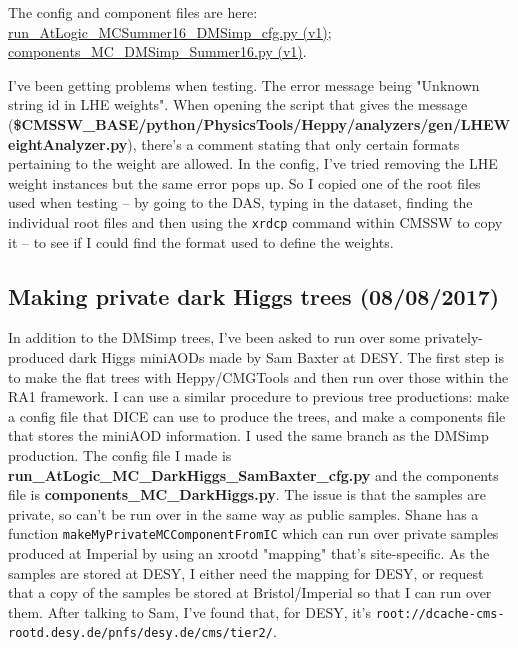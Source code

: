 The config and component files are here: \href{run:sec24/run_AtLogic_MCSummer16_DMSimp_cfgv1.py}{run\_AtLogic\_MCSummer16\_DMSimp\_cfg.py (v1)}; \href{run:sec24/components_MC_DMSimp_Summer16v1.py}{components\_MC\_DMSimp\_Summer16.py (v1)}.

I've been getting problems when testing. The error message being "Unknown string id in LHE weights". When opening the script that gives the message (\textbf{\$CMSSW\_BASE/python/PhysicsTools/Heppy/analyzers/gen/LHEWeightAnalyzer.py}), there's a comment stating that only certain formats pertaining to the weight are allowed. In the config, I've tried removing the LHE weight instances but the same error pops up. So I copied one of the root files used when testing -- by going to the DAS, typing in the dataset, finding the individual root files and then using the \verb!xrdcp! command within CMSSW to copy it -- to see if I could find the format used to define the weights.




\subsection{Making private dark Higgs trees (08/08/2017)}

In addition to the DMSimp trees, I've been asked to run over some privately-produced dark Higgs miniAODs made by Sam Baxter at DESY. The first step is to make the flat trees with Heppy/CMGTools and then run over those within the RA1 framework. I can use a similar procedure to previous tree productions: make a config file that DICE can use to produce the trees, and make a components file that stores the miniAOD information. I used the same branch as the DMSimp production. The config file I made is \textbf{run\_AtLogic\_MC\_DarkHiggs\_SamBaxter\_cfg.py} and the components file is \textbf{components\_MC\_DarkHiggs.py}. The issue is that the samples are private, so can't be run over in the same way as public samples. Shane has a function \texttt{makeMyPrivateMCComponentFromIC} which can run over private samples produced at Imperial by using an xrootd "mapping" that's site-specific. As the samples are stored at DESY, I either need the mapping for DESY, or request that a copy of the samples be stored at Bristol/Imperial so that I can run over them. After talking to Sam, I've found that, for DESY, it's \texttt{root://dcache-cms-rootd.desy.de/pnfs/desy.de/cms/tier2/}.

